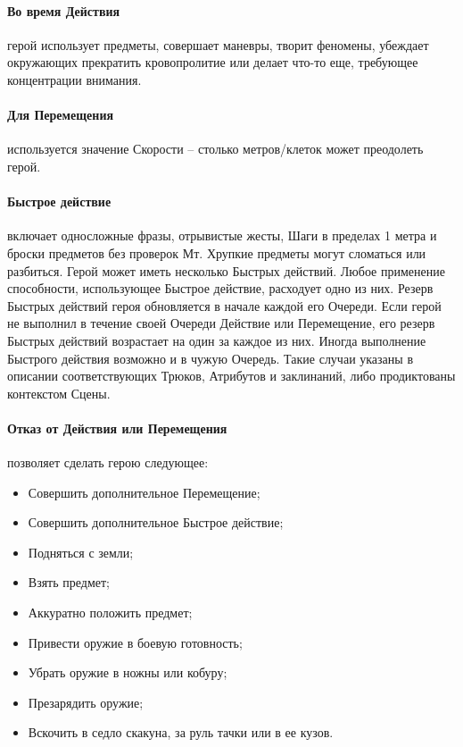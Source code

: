 \paragraph{Во время Действия} герой использует предметы, совершает маневры, творит феномены, убеждает окружающих прекратить кровопролитие или делает что-то еще, требующее концентрации внимания. 
\paragraph{Для Перемещения} используется значение Скорости – столько метров/клеток может преодолеть герой.
\paragraph{Быстрое действие} включает односложные фразы, отрывистые жесты, Шаги в пределах 1 метра и броски предметов без проверок Мт. Хрупкие предметы могут сломаться или разбиться. 
\newline Герой может иметь несколько Быстрых действий. Любое применение способности, использующее Быстрое действие, расходует одно из них. Резерв Быстрых действий героя обновляется в начале каждой его Очереди. Если герой не выполнил в течение своей Очереди Действие или Перемещение, его резерв Быстрых действий возрастает на один за каждое из них.
\newline Иногда выполнение Быстрого действия возможно и в чужую Очередь. Такие случаи указаны в описании соответствующих Трюков, Атрибутов и заклинаний, либо продиктованы контекстом Сцены.

\paragraph{Отказ от Действия или Перемещения} позволяет сделать герою следующее: 
\begin{itemize}
  \item Совершить дополнительное Перемещение;
  \item Совершить дополнительное Быстрое действие;
  \item Подняться с земли;
  \item Взять предмет;
  \item Аккуратно положить предмет;
  \item Привести оружие в боевую готовность;
  \item Убрать оружие в ножны или кобуру;
  \item Презарядить оружие;
  \item Вскочить в седло скакуна, за руль тачки или в ее кузов.
\end{itemize}

